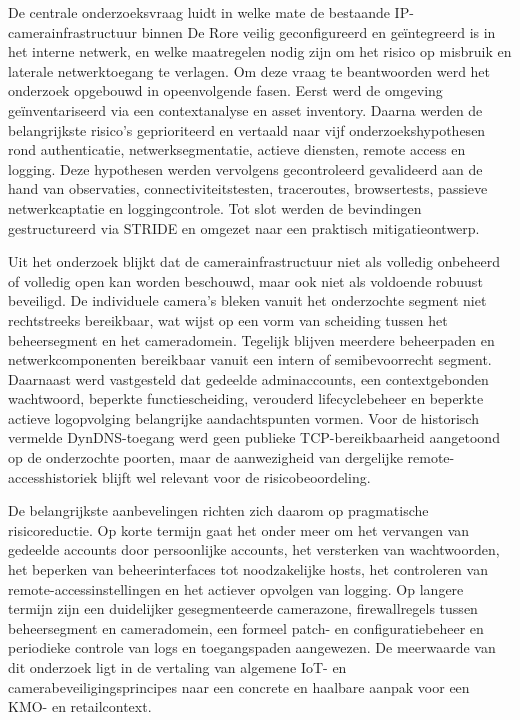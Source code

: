 De centrale onderzoeksvraag luidt in welke mate de bestaande IP-camerainfrastructuur binnen De Rore veilig geconfigureerd en geïntegreerd is in het interne netwerk, en welke maatregelen nodig zijn om het risico op misbruik en laterale netwerktoegang te verlagen. Om deze vraag te beantwoorden werd het onderzoek opgebouwd in opeenvolgende fasen. Eerst werd de omgeving geïnventariseerd via een contextanalyse en asset inventory. Daarna werden de belangrijkste risico's geprioriteerd en vertaald naar vijf onderzoekshypothesen rond authenticatie, netwerksegmentatie, actieve diensten, remote access en logging. Deze hypothesen werden vervolgens gecontroleerd gevalideerd aan de hand van observaties, connectiviteitstesten, traceroutes, browsertests, passieve netwerkcaptatie en loggingcontrole. Tot slot werden de bevindingen gestructureerd via STRIDE en omgezet naar een praktisch mitigatieontwerp.

Uit het onderzoek blijkt dat de camerainfrastructuur niet als volledig onbeheerd of volledig open kan worden beschouwd, maar ook niet als voldoende robuust beveiligd. De individuele camera's bleken vanuit het onderzochte segment niet rechtstreeks bereikbaar, wat wijst op een vorm van scheiding tussen het beheersegment en het cameradomein. Tegelijk blijven meerdere beheerpaden en netwerkcomponenten bereikbaar vanuit een intern of semibevoorrecht segment. Daarnaast werd vastgesteld dat gedeelde adminaccounts, een contextgebonden wachtwoord, beperkte functiescheiding, verouderd lifecyclebeheer en beperkte actieve logopvolging belangrijke aandachtspunten vormen. Voor de historisch vermelde DynDNS-toegang werd geen publieke TCP-bereikbaarheid aangetoond op de onderzochte poorten, maar de aanwezigheid van dergelijke remote-accesshistoriek blijft wel relevant voor de risicobeoordeling.

De belangrijkste aanbevelingen richten zich daarom op pragmatische risicoreductie. Op korte termijn gaat het onder meer om het vervangen van gedeelde accounts door persoonlijke accounts, het versterken van wachtwoorden, het beperken van beheerinterfaces tot noodzakelijke hosts, het controleren van remote-accessinstellingen en het actiever opvolgen van logging. Op langere termijn zijn een duidelijker gesegmenteerde camerazone, firewallregels tussen beheersegment en cameradomein, een formeel patch- en configuratiebeheer en periodieke controle van logs en toegangspaden aangewezen. De meerwaarde van dit onderzoek ligt in de vertaling van algemene IoT- en camerabeveiligingsprincipes naar een concrete en haalbare aanpak voor een KMO- en retailcontext.
